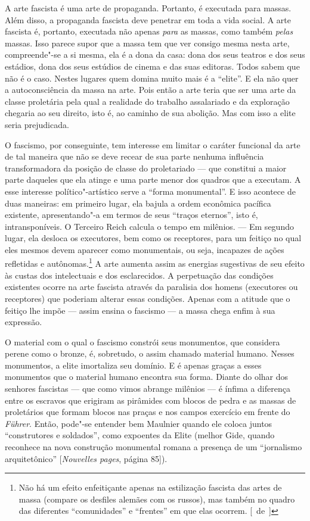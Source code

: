 A arte fascista é uma arte de propaganda. Portanto, é executada para
massas. Além disso, a propaganda fascista deve penetrar em toda a vida
social. A arte fascista é, portanto, executada não apenas \emph{para} as
massas, como também \emph{pelas} massas. Isso parece supor que a massa
tem que ver consigo mesma nesta arte, compreende"-se a si mesma, ela é a
dona da casa: dona dos seus teatros e dos seus estádios, dona dos seus
estúdios de cinema e das suas editoras. Todos sabem que não é o caso.
Nestes lugares quem domina muito mais é a ``elite''. E ela não quer a
autoconsciência da massa na arte. Pois então a arte teria que ser uma
arte da classe proletária pela qual a realidade do trabalho assalariado
e da exploração chegaria ao seu direito, isto é, ao caminho de sua
abolição. Mas com isso a elite seria prejudicada.

O fascismo, por conseguinte, tem interesse ​​em limitar o caráter
funcional da arte de tal maneira que não se deve recear de sua parte
nenhuma influência transformadora da posição de classe do proletariado
--- que constitui a maior parte daqueles que ela atinge e uma parte menor
dos quadros que a executam. A esse interesse político"-artístico serve a
``forma monumental''. E isso acontece de duas maneiras: em primeiro
lugar, ela bajula a ordem econômica pacífica existente, apresentando"-a
em termos de seus ``traços eternos'', isto é, intransponíveis. O
Terceiro Reich calcula o tempo em milênios. --- Em segundo lugar, ela
desloca os executores, bem como os receptores, para um feitiço
no qual eles mesmos devem aparecer como monumentais, ou
seja, incapazes de ações refletidas e autônomas.\footnote{Não há
  um efeito enfeitiçante apenas na estilização fascista das artes de
  massa (compare os desfiles alemães com os russos), mas também no
  quadro das diferentes ``comunidades'' e ``frentes'' em que elas
  ocorrem. [~de~]} A arte aumenta assim as energias sugestivas de seu efeito às
custas dos intelectuais e dos esclarecidos. A perpetuação das condições
existentes ocorre na arte fascista através da paralisia dos homens
(executores ou receptores) que poderiam alterar essas condições. Apenas
com a atitude que o feitiço lhe impõe --- assim ensina o fascismo --- a
massa chega enfim à sua expressão.

O material com o qual o fascismo constrói seus monumentos, que considera
perene como o bronze, é, sobretudo, o assim chamado material humano.
Nesses monumentos, a elite imortaliza seu domínio. E é apenas graças a
esses monumentos que o material humano encontra sua forma. Diante do
olhar dos senhores fascistas --- que como vimos abrange milênios --- é
ínfima a diferença entre os escravos que erigiram as pirâmides com
blocos de pedra e as massas de proletários que formam blocos nas praças
e nos campos exercício em frente do \emph{Führer}. Então, pode"-se %
entender bem Maulnier quando ele coloca juntos ``construtores e
soldados'', como expoentes da Elite (melhor Gide, quando reconhece na
nova construção monumental romana a presença de um ``jornalismo
arquitetônico'' {[}\emph{Nouvelles pages}, página 85{]}).

